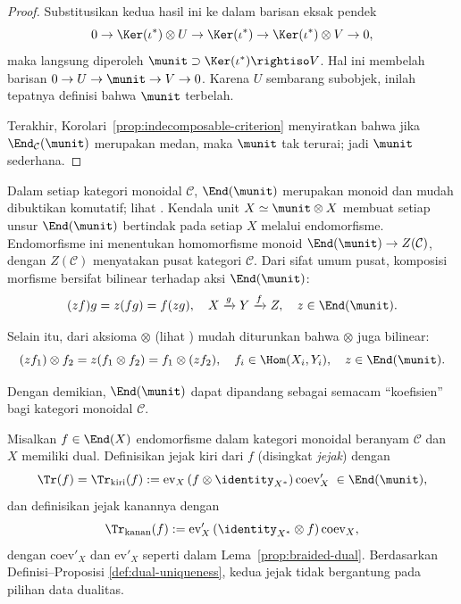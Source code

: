 \begin{proof}
	Substitusikan kedua hasil ini ke dalam barisan eksak pendek
	\[ 0 \to \Ker(\iota^*) \otimes U \to \Ker(\iota^*) \to \Ker(\iota^*) \otimes V \to 0, \]
	maka langsung diperoleh
$\munit\supset\Ker(\iota^*)\rightiso V$. Hal ini membelah barisan
$0\to U\to\munit\to V\to0$. Karena $U$ sembarang subobjek, inilah tepatnya
definisi bahwa $\munit$ terbelah.

	Terakhir, Korolari~\ref{prop:indecomposable-criterion} menyiratkan bahwa
jika $\End_{\mathcal{C}}(\munit)$ merupakan medan, maka $\munit$ tak
terurai; jadi $\munit$ sederhana.
\end{proof}

Dalam setiap kategori monoidal $\mathcal{C}$, $\End(\munit)$ merupakan
monoid dan mudah dibuktikan komutatif; lihat \cite[Latihan Bab 3]{Li1}.
Kendala unit $X\simeq\munit\otimes X$ membuat setiap unsur
$\End(\munit)$ bertindak pada setiap $X$ melalui endomorfisme. Endomorfisme
ini menentukan homomorfisme monoid
$\End(\munit)\to Z(\mathcal{C})$, dengan $Z(\mathcal{C})$ menyatakan pusat
kategori $\mathcal{C}$. Dari sifat umum pusat, komposisi morfisme bersifat
bilinear terhadap aksi $\End(\munit)$:
\[ (z f) g = z(f g) = f (z g), \quad X \xrightarrow{g} Y \xrightarrow{f} Z, \quad z \in \End(\munit). \]

Selain itu, dari aksioma $\otimes$ (lihat \cite[\S 3.1]{Li1}) mudah
diturunkan bahwa $\otimes$ juga bilinear:
\[ (zf_1) \otimes f_2 = z(f_1 \otimes f_2) = f_1 \otimes (z f_2), \quad f_i \in \Hom(X_i, Y_i), \quad z \in \End(\munit). \]

Dengan demikian, $\End(\munit)$ dapat dipandang sebagai semacam
``koefisien'' bagi kategori monoidal $\mathcal{C}$.

\begin{definition}
	Misalkan $f\in\End(X)$ endomorfisme dalam kategori monoidal beranyam
$\mathcal{C}$ dan $X$ memiliki dual. Definisikan jejak kiri dari $f$
(disingkat \emph{jejak}) dengan
	\[ \Tr(f) = \Tr_{\text{kiri}}(f) := \mathrm{ev}_X \left( f \otimes \identity_{X^*} \right) \mathrm{coev}'_X \; \in \End(\munit), \]
	dan definisikan jejak kanannya dengan
	\[ \Tr_{\text{kanan}}(f) := \mathrm{ev}'_X \left( \identity_{X^*} \otimes f \right) \mathrm{coev}_X, \]
	dengan $\mathrm{coev}'_X$ dan $\mathrm{ev}'_X$ seperti dalam
Lema~\ref{prop:braided-dual}. Berdasarkan Definisi--Proposisi
\ref{def:dual-uniqueness}, kedua jejak tidak bergantung pada pilihan data
dualitas.
\end{definition}

